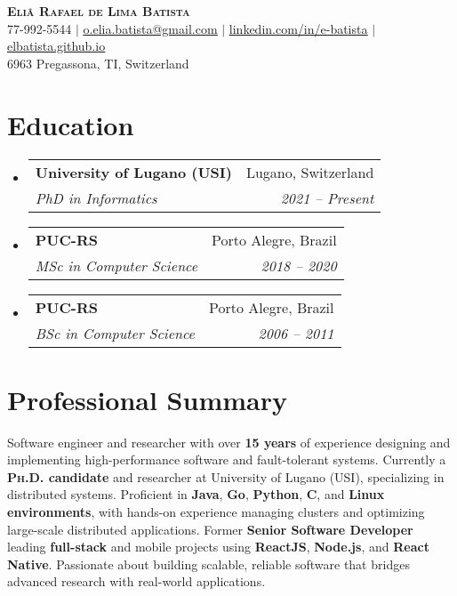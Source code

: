\documentclass[letterpaper,11pt]{article}
\makeatletter
\newcommand{\resumeSubheading}[4]{
  \vspace{-2pt}\item
    \begin{tabular*}{0.97\textwidth}[t]{l@{\extracolsep{\fill}}r}
      \textbf{#1} & #2 \\
      \textit{\small#3} & \textit{\small #4} \\
    \end{tabular*}\vspace{-7pt}
}
\newcommand{\resumeSubHeadingListStart}{\begin{itemize}[leftmargin=0.15in, label={}]}
\newcommand{\resumeSubHeadingListEnd}{\end{itemize}}
\makeatother
\begin{document}

\begin{center}
    \textbf{\huge \scshape Eliã Rafael de Lima Batista} \\ \vspace{15pt}
    \small 77-992-5544 $|$ \href{mailto:o.elia.batista@gmail.com}{\underline{o.elia.batista@gmail.com}} $|$ 
    \href{https://www.linkedin.com/in/e-batista}{\underline{linkedin.com/in/e-batista}} $|$
    \href{https://elbatista.github.io}{\underline{elbatista.github.io}} \\
    \vspace{5pt}
    \small 6963 Pregassona, TI, Switzerland
\end{center}

\vspace{2pt}

\section{Education}
  \resumeSubHeadingListStart
    \resumeSubheading
      {University of Lugano (USI)}{Lugano, Switzerland}
      {PhD in Informatics}{2021 -- Present}
    \resumeSubheading
      {PUC-RS}{Porto Alegre, Brazil}
      {MSc in Computer Science}{2018 -- 2020}
    \resumeSubheading
      {PUC-RS}{Porto Alegre, Brazil}
      {BSc in Computer Science}{2006 -- 2011}
  \resumeSubHeadingListEnd


  \vspace{2pt}

  \section{Professional Summary}

  \begin{adjustwidth}{0.15in}{0pt}
  \small
  Software engineer and researcher with over \textbf{15 years} of experience designing and implementing high-performance software and fault-tolerant systems. Currently a \textbf{\textsc{Ph.D.} candidate} and researcher at University of Lugano (\textsc{USI}), specializing in distributed systems. Proficient in \textbf{Java}, \textbf{Go}, \textbf{Python}, \textbf{C}, and \textbf{Linux environments}, with hands-on experience managing clusters and optimizing large-scale distributed applications. Former \textbf{Senior Software Developer} leading \textbf{full-stack} and mobile projects using \textbf{ReactJS}, \textbf{Node.js}, and \textbf{React Native}. Passionate about building scalable, reliable software that bridges advanced research with real-world applications.


  \end{adjustwidth}
\end{document}
